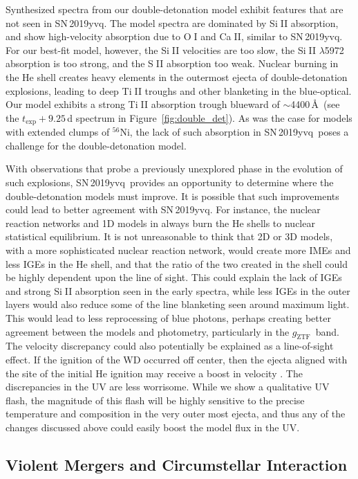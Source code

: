 \documentclass[twocolumn]{aastex63}
\def\ion#1#2{#1$\;${\footnotesize\rm{#2}}\relax}
\newcommand{\gztf}{$g_\mathrm{ZTF}$}
\newcommand{\radni}{$^{56}$Ni}
\newcommand{\sn}{SN\,2019yvq}
\begin{document}
Synthesized spectra from our double-detonation model exhibit features that are
not seen in \sn. The model spectra are dominated by \ion{Si}{II} absorption,
and show high-velocity absorption due to \ion{O}{I} and \ion{Ca}{II}, similar
to \sn. For our best-fit model, however, the \ion{Si}{II} velocities are too
slow, the \ion{Si}{II} $\lambda$5972 absorption is too strong, and the
\ion{S}{II} absorption too weak. Nuclear burning in the He shell creates heavy
elements in the outermost ejecta of double-detonation explosions, leading to
deep \ion{Ti}{II} troughs and other blanketing in the blue-optical. Our model
exhibits a strong \ion{Ti}{II} absorption trough blueward of $\sim$4400\,\AA\
(see the $t_\mathrm{exp} + 9.25$\,d spectrum in Figure~\ref{fig:double_det}).
As was the case for models with extended clumps of \radni, the lack of such
absorption in \sn\ poses a challenge for the double-detonation model.

With observations that probe a previously unexplored phase in the evolution of
such explosions, \sn\ provides an opportunity to determine where the
double-detonation models must improve. It is possible that such improvements
could lead to better agreement with \sn. For instance, the nuclear reaction
networks and 1D models in \citet{Polin19} always burn the He shells to nuclear
statistical equilibrium. It is not unreasonable to think that 2D or 3D models,
with a more sophisticated nuclear reaction network, would create more IMEs and
less IGEs in the He shell, and that the ratio of the two created in the shell
could be highly dependent upon the line of sight. This could explain the lack
of IGEs and strong \ion{Si}{II} absorption seen in the early spectra, while
less IGEs in the outer layers would also reduce some of the line blanketing
seen around maximum light. This would lead to less reprocessing of blue
photons, perhaps creating better agreement between the models and photometry,
particularly in the \gztf\ band. The velocity discrepancy could also
potentially be explained as a line-of-sight effect. If the ignition of the WD
occurred off center, then the ejecta aligned with the site of the initial He
ignition may receive a boost in velocity \citep[e.g.,][]{Kromer10}. The
discrepancies in the UV are less worrisome. While we show a qualitative UV
flash, the magnitude of this flash will be highly sensitive to the precise
temperature and composition in the very outer most ejecta, and thus any of the
changes discussed above could easily boost the model flux in the UV.

\subsection{Violent Mergers and Circumstellar
Interaction}\label{sec:merger_csm}
\end{document}
